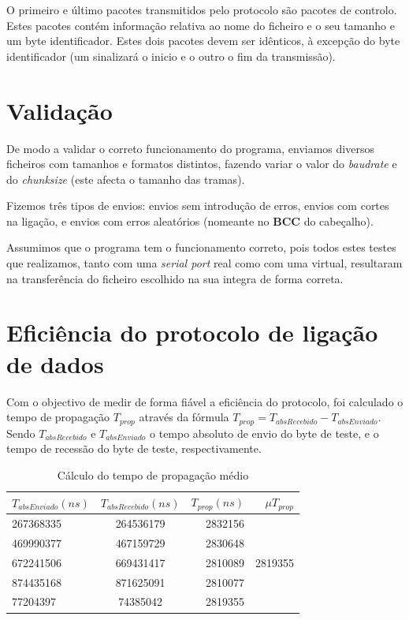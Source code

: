 \documentclass[11pt]{report}
\begin{document}
O primeiro e último pacotes transmitidos pelo protocolo são pacotes de controlo.
Estes pacotes contém informação relativa ao nome do ficheiro e o seu tamanho e
um byte identificador. Estes dois pacotes devem ser idênticos, à excepção do byte
identificador (um sinalizará o inicio e o outro o fim da transmissão).

{\let\clearpage\relax \chapter{Validação}}

De modo a validar o correto funcionamento do programa, enviamos diversos ficheiros
com tamanhos e formatos distintos, fazendo variar o valor do \textit{baudrate}
e do \textit{chunksize} (este afecta o tamanho das tramas).

Fizemos três tipos de envios: envios sem introdução de erros, envios com cortes
na ligação, e envios com erros aleatórios (nomeante no \textbf{BCC} do cabeçalho).

Assumimos que o programa tem o funcionamento correto, pois todos estes testes
que realizamos, tanto com uma \textit{serial port} real como com uma virtual,
resultaram na transferência do ficheiro escolhido na sua integra de forma correta.

\chapter{Eficiência do protocolo de ligação de dados}

Com o objectivo de medir de forma fiável a eficiência do protocolo, foi calculado
o tempo de propagação $T_{prop}$ através da fórmula $T_{prop} = T_{absRecebido} -
T_{absEnviado}$. Sendo $T_{absRecebido}$ e $T_{absEnviado}$ o tempo absoluto de
envio do byte de teste, e o tempo de recessão do byte de teste, respectivamente.

\begin{table}[h!]
  \begin{center}
    \caption{Cálculo do tempo de propagação médio}
    \label{tab:table1}
    \begin{tabular}{l|c|r|r} %
        \textbf{$T_{absEnviado}(ns)$} &\textbf{$T_{absRecebido}(ns)$} & \textbf{$T_{prop}(ns)$} & \textbf{$\mu T_{prop}$}\\
      \hline
      267368335 & 264536179 & 2832156\\
      469990377 & 467159729 & 2830648\\
        672241506 & 669431417 & 2810089 & 2819355\\
      874435168 & 871625091 & 2810077\\
      77204397 & 74385042 & 2819355\\
    \end{tabular}
  \end{center}
\end{table}
\end{document}
